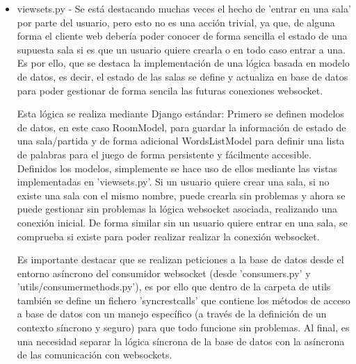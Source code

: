 \begin{itemize}
		  De forma extra, también se ha definido un Enum que identifica el estado de un jugador y una clase WebsocketUser que hace referencia a la información del usuario
		  que hace uso de la conexión websocket con el servidor a la hora de entrar en una sala de juego (dentro de 'utils/consumer\textunderscore classes.py'). De esta forma se 
		  facilita la lógica de la aplicación y se estructuran de forma más ordenada los datos.

	\item viewsets.py - Se está destacando muchas veces el hecho de 'entrar en una sala' por parte del usuario, pero esto no es una acción trivial, ya que, de alguna forma
		  el cliente web debería poder conocer de forma sencilla el estado de una supuesta sala si es que un usuario quiere crearla o en todo caso entrar a una. Es por ello, que se destaca la implementación
		  de una lógica basada en modelo de datos, es decir, el estado de las salas se define y actualiza en base de datos para poder gestionar de forma sencila las futuras conexiones websocket.

		  Esta lógica se realiza mediante Django estándar: Primero se definen modelos de datos, en este caso RoomModel, para guardar la información de estado de una sala/partida
		  y de forma adicional WordsListModel para definir una lista de palabras para el juego de forma persistente y fácilmente accesible. Definidos los modelos, simplemente se hace uso de ellos mediante
		  las vistas implementadas en 'viewsets.py'. Si un usuario quiere crear una sala, si no existe una sala con el mismo nombre, puede crearla sin problemas y ahora se puede gestionar sin problemas
		  la lógica websocket asociada, realizando una conexión inicial. De forma similar sin un usuario quiere entrar en una sala, se comprueba si existe para poder realizar realizar la conexión websocket.

		  Es importante destacar que se realizan peticiones a la base de datos desde el entorno asíncrono del consumidor websocket (desde 'consumers.py' 
		  y 'utils/consumer\textunderscore methods.py'), es por ello que dentro de la carpeta de utils también se define un fichero 'sync\textunderscore rest\textunderscore calls' que contiene 
		  los métodos de acceso a base de datos con un manejo específico (a través de la definición de un contexto síncrono y seguro) para que todo funcione sin problemas. Al final, es una necesidad
		  separar la lógica síncrona de la base de datos con la asíncrona de las comunicación con websockets.
	
\end{itemize}

